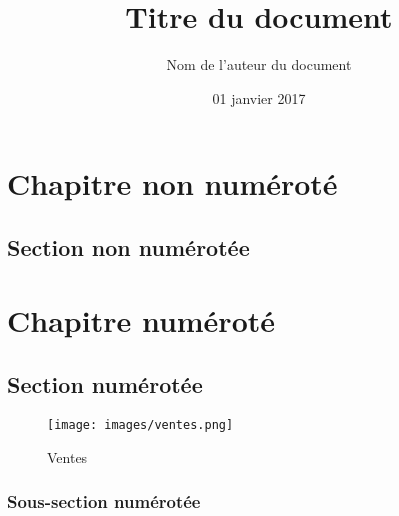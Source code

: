 \documentclass[a4paper,12pt]{report}
\begin{document}

\title{Titre du document}
\date{01 janvier 2017}
\author{Nom de l'auteur du document}
	
\maketitle

\tableofcontents
\listoffigures

\pagestyle{fancy}
\chapter*{Chapitre non numéroté}
\section*{Section non numérotée}

\chapter{Chapitre numéroté}
\section{Section numérotée}

\begin{figure}
	\centering
	\texttt{[image: images/ventes.png]}
	\caption{Ventes}
	\label{fig:ventes}
\end{figure}


\subsection{Sous-section numérotée}
%
\end{document}
